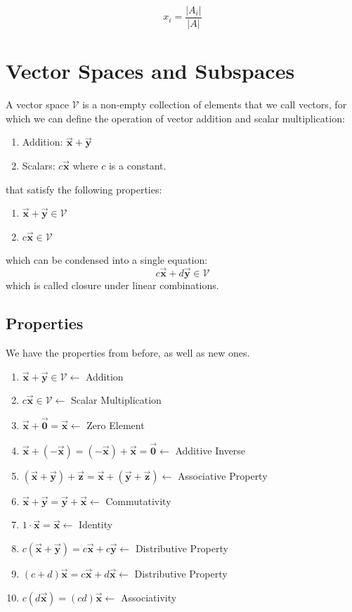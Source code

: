 \documentclass[12pt, landscape, twocolumn]{article}
\let\oldvec\vec
\renewcommand{\vec}[1]{\oldvec{\mathbf{ #1 } } }                    %
\begin{document}
        \begin{equation}\label{eq:cramer}
            x_i = \frac{|A_i|}{|A|}
        \end{equation}


\section{Vector Spaces and Subspaces}
A vector space $\mathcal{V}$ is a non-empty collection of elements that we call vectors, for which we can define the operation of vector addition and scalar multiplication:
    \begin{enumerate}
    \item Addition: $\vec{x} + \vec{y}$
    \item Scalars: $c \vec{x}$ where $c$ is a constant.
    \end{enumerate}
that satisfy the following properties:
    \begin{enumerate}
    \item $\vec{x} + \vec{y} \in \mathcal{V}$
    \item $c \vec{x} \in \mathcal{V}$
    \end{enumerate}

which can be condensed into a single equation:
\[
    c\vec{x} + d\vec{y} \in \mathcal{V}
\]
which is called closure under linear combinations.

    \subsection{Properties}
    We have the properties from before, as well as new ones.

    \begin{enumerate}
    \item $\vec{x} + \vec{y} \in \mathcal{V} \leftarrow $ Addition
    \item $c \vec{x} \in \mathcal{V} \leftarrow $ Scalar Multiplication
    \item $\vec{x} + \vec{0} = \vec{x} \leftarrow $ Zero Element
    \item $\vec{x} + (-\vec{x}) = (-\vec{x}) + \vec{x} = \vec{0} \leftarrow $ Additive Inverse
    \item $(\vec{x} + \vec{y}) + \vec{z} = \vec{x} + (\vec{y} + \vec{z}) \leftarrow$ Associative Property
    \item $\vec{x} + \vec{y} = \vec{y} + \vec{x} \leftarrow $ Commutativity
    \item $1 \cdot \vec{x} = \vec{x} \leftarrow$ Identity
    \item $c (\vec{x} + \vec{y}) = c\vec{x} + c\vec{y} \leftarrow $ Distributive Property
    \item $(c + d) \vec{x} = c\vec{x} + d\vec{x} \leftarrow $ Distributive Property
    \item $c(d\vec{x}) = (cd)\vec{x} \leftarrow $ Associativity
    \end{enumerate}
\end{document}

